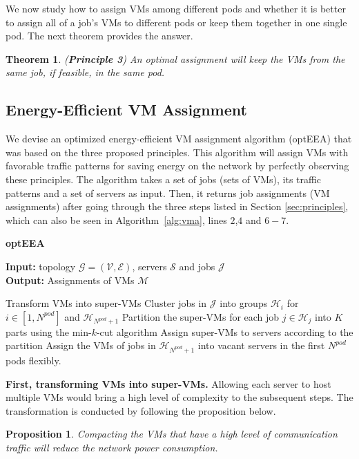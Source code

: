 \documentclass[journal,single-space,two column,twoside,10pt]{IEEEtran}
\newtheorem{theorem}{Theorem}
\newtheorem{proposition}{Proposition}
\begin{document}
We now study how to assign VMs among different pods and whether it is better to assign all of a job's VMs to different pods or keep them together in one single pod. The next theorem provides the answer.

\begin{theorem}
(\textbf{Principle 3}) An optimal assignment will keep the VMs from the same job, if feasible, in the same pod.
\end{theorem}


\subsection{Energy-Efficient VM Assignment}

We devise an optimized energy-efficient VM assignment algorithm (optEEA) that was based on the three proposed principles. This algorithm will assign VMs with favorable traffic patterns for saving energy on the network by perfectly observing these principles. The algorithm takes a set of jobs (sets of VMs), its traffic patterns and a set of servers as input. Then, it returns job assignments (VM assignments) after going through the three steps listed in Section \ref{sec:principles}, which can also be seen in Algorithm~\ref{alg:vma}, lines $2$,$4$ and $6-7$.


\setlength{\textfloatsep}{10pt}
\begin{algorithm}[!t]
\caption{\label{alg:vma} \textbf{optEEA}}
\textbf{Input: } topology $\mathcal{G}=(\mathcal{V},\mathcal{E})$, servers $\mathcal{S}$ and jobs $\mathcal{J}$\\
\textbf{Output: } Assignments of VMs $\mathcal{M}$

\begin{algorithmic}[1]
	\STATE Transform VMs into super-VMs
\ENDFOR
\STATE Cluster jobs in $\mathcal{J}$ into groups $\mathcal{H}_i$ for $i \in [1,N^{pod}]$ and $\mathcal{H}_{N^{pod} + 1}$ 
	\STATE Partition the super-VMs for each job $j \in \mathcal{H}_j$ into $K$ parts using the min-$k$-cut algorithm
	\STATE Assign super-VMs to servers according to the partition
\ENDFOR
\STATE Assign the VMs of jobs in $\mathcal{H}_{N^{pod} + 1}$ into vacant servers in the first $N^{pod}$ pods flexibly.
\end{algorithmic}
\end{algorithm}

\textbf{First, transforming VMs into super-VMs.} Allowing each server to host multiple VMs would bring a high level of complexity to the subsequent steps. The transformation is conducted by following the proposition below.
\begin{proposition}
\label{prop:transformation}
Compacting the VMs that have a high level of communication traffic will reduce the network power consumption.
\end{proposition}
\end{document}
